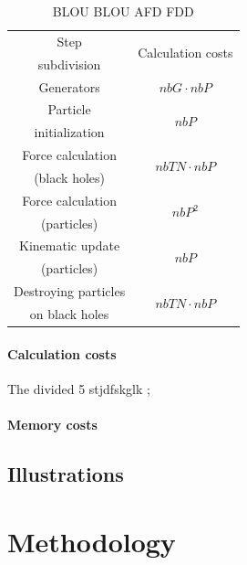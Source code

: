 \documentclass[a4paper]{article} %
\begin{document}
\begin{multicols*}{2}
\begin{table}[H]
\begin{center}
\begin{tabular}{|c|c|}
\hline
Step & \multicolumn{1}{|c|}{\multirow{2}{*}{Calculation costs}} \\
subdivision   &  \\
\hline
\hline
Generators &  $nbG\cdot nbP$\\
\hline
Particle  &       \multicolumn{1}{|c|}{\multirow{2}{*}{$nbP$}}\\
initialization &  \\
\hline
Force calculation  & \multicolumn{1}{|c|}{\multirow{2}{*}{$nbTN\cdot nbP$}}\\
(black holes) &  \\
\hline
Force calculation  & \multicolumn{1}{|c|}{\multirow{2}{*}{$nbP^2$}}\\
(particles) &  \\
\hline
Kinematic update  & \multicolumn{1}{|c|}{\multirow{2}{*}{$nbP$}}\\
(particles) &  \\
\hline
Destroying particles &  \multicolumn{1}{|c|}{\multirow{2}{*}{$nbTN\cdot nbP$}}\\
 on black holes &  \\
\hline
\end{tabular}
\end{center}
\caption{BLOU BLOU AFD FDD}
\end{table}

\paragraph{Calculation costs}
The divided 5 stjdfskglk ;

\paragraph{Memory costs}


\subsection{Illustrations}


\section{Methodology}

\end{multicols*}
\end{document}
